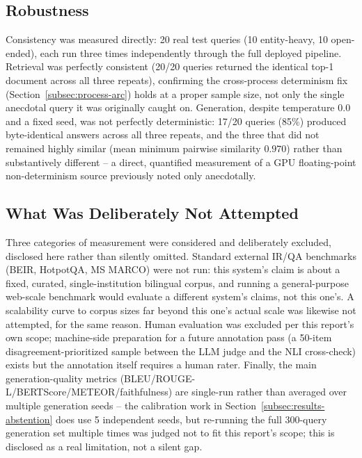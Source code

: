 \documentclass[a4paper,twoside]{article}
\begin{document}
\subsection{Robustness}
\label{subsec:results-robustness}

Consistency was measured directly: 20 real test queries (10 entity-heavy, 10 open-ended), each run three times independently through the full deployed pipeline. Retrieval was perfectly consistent (20/20 queries returned the identical top-1 document across all three repeats), confirming the cross-process determinism fix (Section~\ref{subsec:process-arc}) holds at a proper sample size, not only the single anecdotal query it was originally caught on. Generation, despite temperature $0.0$ and a fixed seed, was not perfectly deterministic: 17/20 queries (85\%) produced byte-identical answers across all three repeats, and the three that did not remained highly similar (mean minimum pairwise similarity $0.970$) rather than substantively different -- a direct, quantified measurement of a GPU floating-point non-determinism source previously noted only anecdotally.

\subsection{What Was Deliberately Not Attempted}
\label{subsec:not-attempted}

Three categories of measurement were considered and deliberately excluded, disclosed here rather than silently omitted. Standard external IR/QA benchmarks (BEIR, HotpotQA, MS MARCO) were not run: this system's claim is about a fixed, curated, single-institution bilingual corpus, and running a general-purpose web-scale benchmark would evaluate a different system's claims, not this one's. A scalability curve to corpus sizes far beyond this one's actual scale was likewise not attempted, for the same reason. Human evaluation was excluded per this report's own scope; machine-side preparation for a future annotation pass (a 50-item disagreement-prioritized sample between the LLM judge and the NLI cross-check) exists but the annotation itself requires a human rater. Finally, the main generation-quality metrics (BLEU/ROUGE-L/BERTScore/METEOR/faithfulness) are single-run rather than averaged over multiple generation seeds -- the calibration work in Section~\ref{subsec:results-abstention} does use 5 independent seeds, but re-running the full 300-query generation set multiple times was judged not to fit this report's scope; this is disclosed as a real limitation, not a silent gap.
\end{document}
